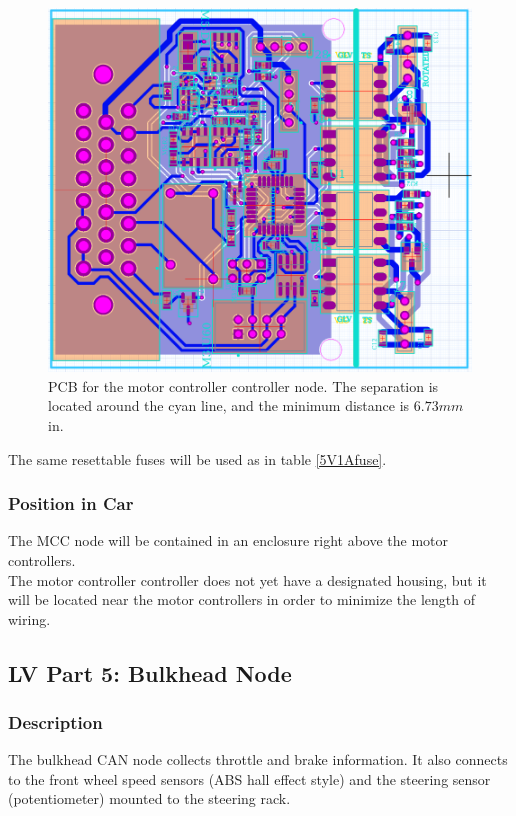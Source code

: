 \documentclass{article}
\begin{document}
{        \begin{figure}[H]
        \centering
        \includegraphics[width = 0.8 \textwidth]{mccPCB}
        \caption{PCB for the motor controller controller node. The separation is located around the cyan line, and the minimum distance is $6.73 mm$ in.}
        \label{mccPCB}
        \end{figure}

        The same resettable fuses will be used as in table \ref{5V1Afuse}.

        \subsubsection{Position in Car}
        The MCC node will be contained in an enclosure right above the motor controllers.\\

        The motor controller controller does not yet have a designated housing, but it will be located near the motor controllers in order to minimize the length of wiring.

        \subsection{LV Part 5: Bulkhead Node}

            \subsubsection{Description}

            The bulkhead CAN node collects throttle and brake information. It also connects to the front wheel speed sensors (ABS hall effect style) and the steering sensor (potentiometer) mounted to the steering rack.

}
\end{document}
